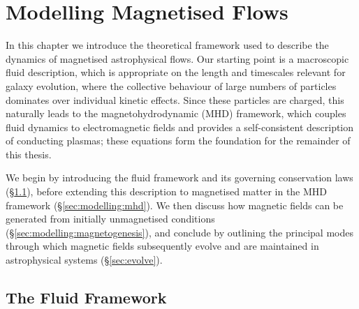 \section{Modelling Magnetised Flows}
\label{sec:modelling}

In this chapter we introduce the theoretical framework used to describe the dynamics of magnetised astrophysical flows. Our starting point is a macroscopic fluid description, which is appropriate on the length and timescales relevant for galaxy evolution, where the collective behaviour of large numbers of particles dominates over individual kinetic effects. Since these particles are charged, this naturally leads to the magnetohydrodynamic (MHD) framework, which couples fluid dynamics to electromagnetic fields and provides a self-consistent description of conducting plasmas; these equations form the foundation for the remainder of this thesis.

We begin by introducing the fluid framework and its governing conservation laws (\S\ref{sec:modelling:fluid}), before extending this description to magnetised matter in the MHD framework (\S\ref{sec:modelling:mhd}). We then discuss how magnetic fields can be generated from initially unmagnetised conditions (\S\ref{sec:modelling:magnetogenesis}), and conclude by outlining the principal modes through which magnetic fields subsequently evolve and are maintained in astrophysical systems (\S\ref{sec:evolve}).

\subsection{The Fluid Framework}
\label{sec:modelling:fluid}

